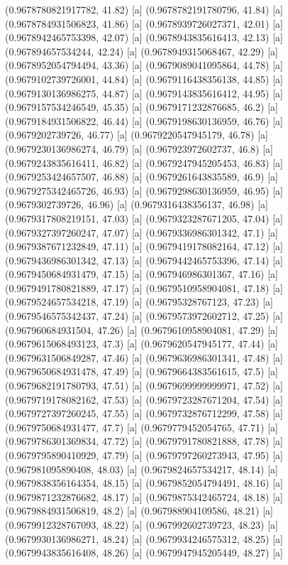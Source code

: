 {{{(0.9678780821917782, 41.82) [a] 
(0.9678782191780796, 41.84) [a] 
(0.9678784931506823, 41.86) [a] 
(0.9678939726027371, 42.01) [a] 
(0.9678942465753398, 42.07) [a] 
(0.9678943835616413, 42.13) [a] 
(0.967894657534244, 42.24) [a] 
(0.9678949315068467, 42.29) [a] 
(0.9678952054794494, 43.36) [a] 
(0.9679089041095864, 44.78) [a] 
(0.9679102739726001, 44.84) [a] 
(0.9679116438356138, 44.85) [a] 
(0.9679130136986275, 44.87) [a] 
(0.9679143835616412, 44.95) [a] 
(0.9679157534246549, 45.35) [a] 
(0.9679171232876685, 46.2) [a] 
(0.9679184931506822, 46.44) [a] 
(0.9679198630136959, 46.76) [a] 
(0.9679202739726, 46.77) [a] 
(0.9679220547945179, 46.78) [a] 
(0.9679230136986274, 46.79) [a] 
(0.967923972602737, 46.8) [a] 
(0.9679243835616411, 46.82) [a] 
(0.9679247945205453, 46.83) [a] 
(0.9679253424657507, 46.88) [a] 
(0.9679261643835589, 46.9) [a] 
(0.9679275342465726, 46.93) [a] 
(0.9679298630136959, 46.95) [a] 
(0.9679302739726, 46.96) [a] 
(0.9679316438356137, 46.98) [a] 
(0.9679317808219151, 47.03) [a] 
(0.9679323287671205, 47.04) [a] 
(0.9679327397260247, 47.07) [a] 
(0.9679336986301342, 47.1) [a] 
(0.9679387671232849, 47.11) [a] 
(0.9679419178082164, 47.12) [a] 
(0.9679436986301342, 47.13) [a] 
(0.9679442465753396, 47.14) [a] 
(0.9679450684931479, 47.15) [a] 
(0.967946986301367, 47.16) [a] 
(0.9679491780821889, 47.17) [a] 
(0.9679510958904081, 47.18) [a] 
(0.9679524657534218, 47.19) [a] 
(0.96795328767123, 47.23) [a] 
(0.9679546575342437, 47.24) [a] 
(0.9679573972602712, 47.25) [a] 
(0.967960684931504, 47.26) [a] 
(0.9679610958904081, 47.29) [a] 
(0.9679615068493123, 47.3) [a] 
(0.9679620547945177, 47.44) [a] 
(0.9679631506849287, 47.46) [a] 
(0.9679636986301341, 47.48) [a] 
(0.9679650684931478, 47.49) [a] 
(0.9679664383561615, 47.5) [a] 
(0.9679682191780793, 47.51) [a] 
(0.9679699999999971, 47.52) [a] 
(0.9679719178082162, 47.53) [a] 
(0.9679723287671204, 47.54) [a] 
(0.9679727397260245, 47.55) [a] 
(0.9679732876712299, 47.58) [a] 
(0.9679750684931477, 47.7) [a] 
(0.9679779452054765, 47.71) [a] 
(0.9679786301369834, 47.72) [a] 
(0.9679791780821888, 47.78) [a] 
(0.9679795890410929, 47.79) [a] 
(0.9679797260273943, 47.95) [a] 
(0.967981095890408, 48.03) [a] 
(0.9679824657534217, 48.14) [a] 
(0.9679838356164354, 48.15) [a] 
(0.9679852054794491, 48.16) [a] 
(0.9679871232876682, 48.17) [a] 
(0.9679875342465724, 48.18) [a] 
(0.9679884931506819, 48.2) [a] 
(0.967988904109586, 48.21) [a] 
(0.9679912328767093, 48.22) [a] 
(0.967992602739723, 48.23) [a] 
(0.9679930136986271, 48.24) [a] 
(0.9679934246575312, 48.25) [a] 
(0.9679943835616408, 48.26) [a] 
(0.9679947945205449, 48.27) [a] 
}}}
